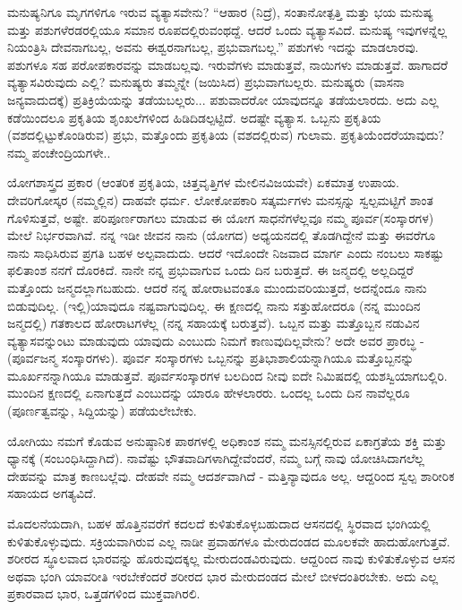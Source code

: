 ಮನುಷ್ಯನಿಗೂ ಮೃಗಗಳಿಗೂ ಇರುವ ವ್ಯತ್ಯಾಸವೇನು? “ಆಹಾರ (ನಿದ್ರೆ), ಸಂತಾನೋತ್ಪತ್ತಿ ಮತ್ತು ಭಯ ಮನುಷ್ಯ ಮತ್ತು ಪಶುಗಳೆರಡರಲ್ಲಿಯೂ ಸಮಾನ ರೂಪದಲ್ಲಿರುವಂಥದ್ದೆ. ಆದರೆ ಒಂದು ವ್ಯತ್ಯಾಸವಿದೆ. ಮನುಷ್ಯ ಇವುಗಳನ್ನೆಲ್ಲ ನಿಯಂತ್ರಿಸಿ ದೇವನಾಗಬಲ್ಲ, ಅವನು ಈಶ್ವರನಾಗಬಲ್ಲ, ಪ್ರಭುವಾಗಬಲ್ಲ.'' ಪಶುಗಳು ಇದನ್ನು ಮಾಡಲಾರವು. ಪಶುಗಳೂ ಸಹ ಪರೋಪಕಾರವನ್ನು ಮಾಡಬಲ್ಲವು. ಇರುವೆಗಳು ಮಾಡುತ್ತವೆ, ನಾಯಿಗಳು ಮಾಡುತ್ತವೆ. ಹಾಗಾದರೆ ವ್ಯತ್ಯಾಸವಿರುವುದು ಎಲ್ಲಿ? ಮನುಷ್ಯರು ತಮ್ಮನ್ನೇ (ಜಯಿಸಿದ) ಪ್ರಭುವಾಗಬಲ್ಲರು. ಮನುಷ್ಯರು (ವಾಸನಾ ಜನ್ಯವಾದುದಕ್ಕೆ) ಪ್ರತಿಕ್ರಿಯೆಯನ್ನು ತಡೆಯಬಲ್ಲರು... ಪಶುವಾದರೋ ಯಾವುದನ್ನೂ ತಡೆಯಲಾರದು. ಅದು ಎಲ್ಲ ಕಡೆಯಿಂದಲೂ ಪ್ರಕೃತಿಯ ಶೃಂಖಲೆಗಳಿಂದ ಹಿಡಿದಿಡಲ್ಪಟ್ಟಿದೆ. ಅದಷ್ಟೇ ವ್ಯತ್ಯಾಸ. ಒಬ್ಬನು ಪ್ರಕೃತಿಯ (ವಶದಲ್ಲಿಟ್ಟುಕೊಂಡಿರುವ) ಪ್ರಭು, ಮತ್ತೊಂದು ಪ್ರಕೃತಿಯ (ವಶದಲ್ಲಿರುವ) ಗುಲಾಮ. ಪ್ರಕೃತಿಯೆಂದರೆ\break ಯಾವುದು? ನಮ್ಮ ಪಂಚೇಂದ್ರಿಯಗಳೇ..

ಯೋಗಶಾಸ್ತ್ರದ ಪ್ರಕಾರ (ಆಂತರಿಕ ಪ್ರಕೃತಿಯ, ಚಿತ್ತವೃತ್ತಿಗಳ ಮೇಲಿನ\break ವಿಜಯವೇ) ಏಕಮಾತ್ರ ಉಪಾಯ. ದೇವರಿಗೋಸ್ಕರ (ನಮ್ಮಲ್ಲಿನ) ದಾಹವೇ ಧರ್ಮ. ಲೋಕೋಪಕಾರಿ ಸತ್ಕರ್ಮಗಳು ಮನಸ್ಸನ್ನು ಸ್ವಲ್ಪಮಟ್ಟಿಗೆ ಶಾಂತ ಗೊಳಿಸುತ್ತವೆ, ಅಷ್ಟೇ. ಪರಿಪೂರ್ಣರಾಗಲು ಮಾಡುವ ಈ ಯೋಗ ಸಾಧನೆಗಳೆಲ್ಲವೂ ನಮ್ಮ ಪೂರ್ವ\break (ಸಂಸ್ಕಾರಗಳ) ಮೇಲೆ ನಿರ್ಭರವಾಗಿವೆ. ನನ್ನ ಇಡೀ ಜೀವನ ನಾನು (ಯೋಗದ) ಅಧ್ಯಯನದಲ್ಲಿ ತೊಡಗಿದ್ದೇನೆ ಮತ್ತು ಈವರೆಗೂ ನಾನು ಸಾಧಿಸಿರುವ ಪ್ರಗತಿ ಬಹಳ ಅಲ್ಪವಾದುದು. ಆದರೆ ಇದೊಂದೇ ನಿಜವಾದ ಮಾರ್ಗ ಎಂದು ನಂಬಲು ಸಾಕಷ್ಟು ಫಲಿತಾಂಶ ನನಗೆ ದೊರಕಿದೆ. ನಾನೇ ನನ್ನ ಪ್ರಭುವಾಗುವ ಒಂದು ದಿನ ಬರುತ್ತದೆ. ಈ ಜನ್ಮದಲ್ಲಿ ಅಲ್ಲದಿದ್ದರೆ ಮತ್ತೊಂದು ಜನ್ಮದಲ್ಲಾಗಬಹುದು. ಆದರೆ ನನ್ನ ಹೋರಾಟವಂತೂ ಮುಂದುವರಿಯುತ್ತದೆ, ಅದನ್ನೆಂದೂ ನಾನು ಬಿಡುವುದಿಲ್ಲ. (ಇಲ್ಲಿ)\break ಯಾವುದೂ ನಷ್ಟವಾಗುವುದಿಲ್ಲ. ಈ ಕ್ಷಣದಲ್ಲಿ ನಾನು ಸತ್ತುಹೋದರೂ (ನನ್ನ ಮುಂದಿನ ಜನ್ಮದಲ್ಲಿ) ಗತಕಾಲದ ಹೋರಾಟಗಳೆಲ್ಲ (ನನ್ನ ಸಹಾಯಕ್ಕೆ ಬರುತ್ತವೆ). ಒಬ್ಬನ ಮತ್ತು ಮತ್ತೊಬ್ಬನ ನಡುವಿನ ವ್ಯತ್ಯಾಸವನ್ನುಂಟು ಮಾಡುವುದು ಯಾವುದು ಎಂಬುದು ನಿಮಗೆ ಕಾಣುವುದಿಲ್ಲವೇನು? ಅದೇ ಅವರ ಪ್ರಾರಬ್ಧ - (ಪೂರ್ವಜನ್ಮ ಸಂಸ್ಕಾರಗಳು). ಪೂರ್ವ ಸಂಸ್ಕಾರಗಳು ಒಬ್ಬನನ್ನು ಪ್ರತಿಭಾಶಾಲಿಯನ್ನಾಗಿಯೂ ಮತ್ತೊಬ್ಬನನ್ನು ಮೂರ್ಖನನ್ನಾಗಿಯೂ ಮಾಡುತ್ತವೆ. ಪೂರ್ವಸಂಸ್ಕಾರಗಳ ಬಲದಿಂದ ನೀವು ಐದೇ ನಿಮಿಷದಲ್ಲಿ ಯಶಸ್ವಿಯಾಗಬಲ್ಲಿರಿ. ಮುಂದಿನ ಕ್ಷಣದಲ್ಲಿ ಏನಾಗುತ್ತದೆ ಎಂಬುದನ್ನು ಯಾರೂ ಹೇಳಲಾರರು. ಒಂದಲ್ಲ ಒಂದು ದಿನ ನಾವೆಲ್ಲರೂ (ಪೂರ್ಣತ್ವವನ್ನು, ಸಿದ್ದಿಯನ್ನು) ಪಡೆಯಲೇಬೇಕು.

ಯೋಗಿಯು ನಮಗೆ ಕೊಡುವ ಅನುಷ್ಠಾನಿಕ ಪಾಠಗಳಲ್ಲಿ ಅಧಿಕಾಂಶ ನಮ್ಮ ಮನಸ್ಸಿನಲ್ಲಿರುವ ಏಕಾಗ್ರತೆಯ ಶಕ್ತಿ ಮತ್ತು ಧ್ಯಾನಕ್ಕೆ (ಸಂಬಂಧಿಸಿದ್ದಾಗಿದೆ). ನಾವೆಷ್ಟು ಭೌತವಾದಿಗಳಾಗಿದ್ದೇವೆಂದರೆ, ನಮ್ಮ ಬಗ್ಗೆ ನಾವು ಯೋಚಿಸಿದಾಗಲೆಲ್ಲ ದೇಹವನ್ನು ಮಾತ್ರ ಕಾಣಬಲ್ಲೆವು. ದೇಹವೇ ನಮ್ಮ ಆದರ್ಶವಾಗಿದೆ - ಮತ್ತಿನ್ಯಾವುದೂ ಅಲ್ಲ. ಆದ್ದರಿಂದ ಸ್ವಲ್ಪ ಶಾರೀರಿಕ ಸಹಾಯದ ಅಗತ್ಯವಿದೆ.

ಮೊದಲನೆಯದಾಗಿ, ಬಹಳ ಹೊತ್ತಿನವರೆಗೆ ಕದಲದೆ ಕುಳಿತುಕೊಳ್ಳಬಹುದಾದ ಆಸನದಲ್ಲಿ ಸ್ಥಿರವಾದ ಭಂಗಿಯಲ್ಲಿ ಕುಳಿತುಕೊಳ್ಳುವುದು. ಸಕ್ರಿಯವಾಗಿರುವ ಎಲ್ಲ ನಾಡೀ ಪ್ರವಾಹಗಳೂ ಮೇರುದಂಡದ ಮೂಲಕವೇ ಹಾದುಹೋಗುತ್ತವೆ. ಶರೀರದ ಸ್ಥೂಲವಾದ ಭಾರವನ್ನು ಹೊರುವುದಕ್ಕಲ್ಲ ಮೇರುದಂಡವಿರುವುದು. ಆದ್ದರಿಂದ ನಾವು ಕುಳಿತುಕೊಳ್ಳುವ ಆಸನ ಅಥವಾ ಭಂಗಿ ಯಾವರೀತಿ ಇರಬೇಕೆಂದರೆ ಶರೀರದ ಭಾರ ಮೇರುದಂಡದ ಮೇಲೆ ಬೀಳದಂತಿರಬೇಕು. ಅದು ಎಲ್ಲ ಪ್ರಕಾರವಾದ ಭಾರ, ಒತ್ತಡಗಳಿಂದ ಮುಕ್ತವಾಗಿರಲಿ.

